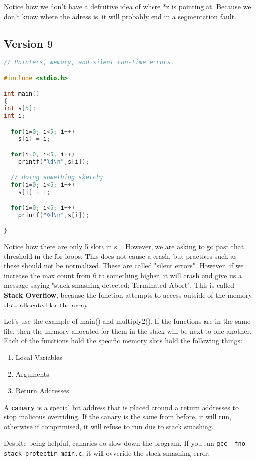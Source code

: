 \documentclass{article}
\begin{document}
Notice how we don't have a definitive idea of where *z is pointing at. Because we don't know where the adress is, it will probably end in a segmentation fault.

\subsection*{Version 9}

\begin{lstlisting}[language=C]
// Pointers, memory, and silent run-time errors.

#include <stdio.h>

int main()
{
int s[5];
int i;

  for(i=0; i<5; i++)
	s[i] = i;

  for(i=0; i<5; i++)
  	printf("%d\n",s[i]);

  // doing something sketchy
  for(i=0; i<6; i++)
	s[i] = i;

  for(i=0; i<6; i++)
	printf("%d\n",s[i]);

}
\end{lstlisting}

Notice how there are only 5 slots in s[]. However, we are asking to go past that threshold in the for loops. This does not cause a crash, but practices such as these should not be normalized. These are called "silent errors".
However, if we increase the max count from 6 to something higher, it will crash and give us a message saying "stack smashing detected; Terminated Abort".
This is called \textbf{Stack Overflow}, because the function attempts to access outside of the memory slots allocated for the array.

Let's use the example of main() and multiply2(). If the functions are in the same file, then the memory allocated for them in the stack will be next to one another. Each of the functions hold the specific memory slots hold the following things:
\begin{enumerate}
    \item Local Variables
    \item Arguments
    \item Return Addresses
\end{enumerate}

A \textbf{canary} is a special bit address that is placed around a return addresses to stop malicous overriding. If the canary is the same from before, it will run, otherwise if comprimised, it will refuse to run due to stack smashing.

Despite being helpful, canaries do slow down the program. If you run \texttt{gcc -fno-stack-protectir main.c}, it will ovveride the stack smashing error.
\end{document}
